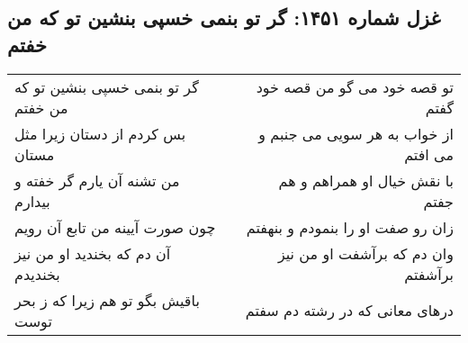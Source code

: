 \begin{center}
\section*{غزل شماره ۱۴۵۱: گر تو بنمی خسپی بنشین تو که من خفتم}
\label{sec:1451}
\begin{longtable}{l p{0.5cm} r}
گر تو بنمی خسپی بنشین تو که من خفتم
&&
تو قصه خود می گو من قصه خود گفتم
\\
بس کردم از دستان زیرا مثل مستان
&&
از خواب به هر سویی می جنبم و می افتم
\\
من تشنه آن یارم گر خفته و بیدارم
&&
با نقش خیال او همراهم و هم جفتم
\\
چون صورت آیینه من تابع آن رویم
&&
زان رو صفت او را بنمودم و بنهفتم
\\
آن دم که بخندید او من نیز بخندیدم
&&
وان دم که برآشفت او من نیز برآشفتم
\\
باقیش بگو تو هم زیرا که ز بحر توست
&&
درهای معانی که در رشته دم سفتم
\\
\end{longtable}
\end{center}
